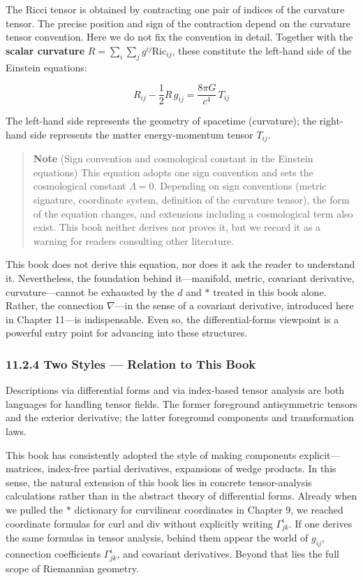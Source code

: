 \documentclass[a4paper,12pt,openany]{book}
\begin{document}
The Ricci tensor is obtained by contracting one pair of indices of the
curvature tensor. The precise position and sign of the contraction
depend on the curvature tensor convention. Here we do not fix the
convention in detail. Together with the \textbf{scalar curvature}
\(R = \sum_i\sum_j g^{ij} \mathrm{Ric}_{ij}\), these constitute the
left-hand side of the Einstein equations:

\[R_{ij} - \frac{1}{2}R\,g_{ij} = \frac{8\pi G}{c^4}\,T_{ij}\]

The left-hand side represents the geometry of spacetime (curvature); the
right-hand side represents the matter energy-momentum tensor \(T_{ij}\).

\begin{quote}
\textbf{Note} (Sign convention and cosmological constant in the Einstein
equations) This equation adopts one sign convention and sets the
cosmological constant \(\Lambda = 0\). Depending on sign conventions
(metric signature, coordinate system, definition of the curvature
tensor), the form of the equation changes, and extensions including a
cosmological term also exist. This book neither derives nor proves it,
but we record it as a warning for readers consulting other literature.
\end{quote}

This book does not derive this equation, nor does it ask the reader to
understand it. Nevertheless, the foundation behind it—manifold,
metric, covariant derivative, curvature—cannot be exhausted by the
\(d\) and \(\ast\) treated in this book alone. Rather, the connection
\(\nabla\)—in the sense of a covariant derivative, introduced here in
Chapter 11—is indispensable. Even so, the differential-forms viewpoint
is a powerful entry point for advancing into these structures.

\hypertarget{two-styles-relation-to-this-book}{%
\subsubsection{11.2.4 Two Styles — Relation to This
Book}\label{two-styles-relation-to-this-book}}

Descriptions via differential forms and via index-based tensor analysis
are both languages for handling tensor fields. The former foreground
antisymmetric tensors and the exterior derivative; the latter foreground
components and transformation laws.

This book has consistently adopted the style of making components
explicit—matrices, index-free partial derivatives, expansions of wedge
products. In this sense, the natural extension of this book lies in
concrete tensor-analysis calculations rather than in the abstract theory
of differential forms. Already when we pulled the \(\ast\) dictionary
for curvilinear coordinates in Chapter 9, we reached coordinate formulas
for \(\mathrm{curl}\) and \(\mathrm{div}\) without explicitly writing
\(\Gamma^i_{jk}\). If one derives the same formulas in tensor analysis,
behind them appear the world of \(g_{ij}\), connection coefficients
\(\Gamma^i_{jk}\), and covariant derivatives. Beyond that lies the full
scope of Riemannian geometry.
\end{document}

